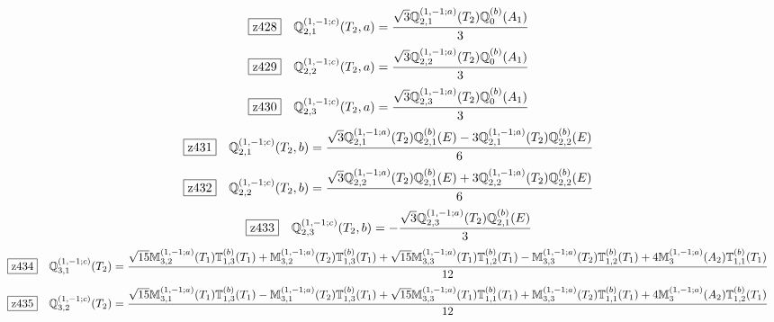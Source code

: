 \documentclass[fleqn,10pt,landscape]{jsarticle}
\begin{document}
\begin{dmath*}
\hspace*{3mm}\fbox{z428}\quad \mathbb{Q}_{2,1}^{(1,-1;c)}(T_{2},a)=\frac{\sqrt{3} \mathbb{Q}_{2,1}^{(1,-1;a)}(T_{2}) \mathbb{Q}_{0}^{(b)}(A_{1})}{3}
\end{dmath*}
\begin{dmath*}
\hspace*{3mm}\fbox{z429}\quad \mathbb{Q}_{2,2}^{(1,-1;c)}(T_{2},a)=\frac{\sqrt{3} \mathbb{Q}_{2,2}^{(1,-1;a)}(T_{2}) \mathbb{Q}_{0}^{(b)}(A_{1})}{3}
\end{dmath*}
\begin{dmath*}
\hspace*{3mm}\fbox{z430}\quad \mathbb{Q}_{2,3}^{(1,-1;c)}(T_{2},a)=\frac{\sqrt{3} \mathbb{Q}_{2,3}^{(1,-1;a)}(T_{2}) \mathbb{Q}_{0}^{(b)}(A_{1})}{3}
\end{dmath*}
\begin{dmath*}
\hspace*{3mm}\fbox{z431}\quad \mathbb{Q}_{2,1}^{(1,-1;c)}(T_{2},b)=\frac{\sqrt{3} \mathbb{Q}_{2,1}^{(1,-1;a)}(T_{2}) \mathbb{Q}_{2,1}^{(b)}(E) - 3 \mathbb{Q}_{2,1}^{(1,-1;a)}(T_{2}) \mathbb{Q}_{2,2}^{(b)}(E)}{6}
\end{dmath*}
\begin{dmath*}
\hspace*{3mm}\fbox{z432}\quad \mathbb{Q}_{2,2}^{(1,-1;c)}(T_{2},b)=\frac{\sqrt{3} \mathbb{Q}_{2,2}^{(1,-1;a)}(T_{2}) \mathbb{Q}_{2,1}^{(b)}(E) + 3 \mathbb{Q}_{2,2}^{(1,-1;a)}(T_{2}) \mathbb{Q}_{2,2}^{(b)}(E)}{6}
\end{dmath*}
\begin{dmath*}
\hspace*{3mm}\fbox{z433}\quad \mathbb{Q}_{2,3}^{(1,-1;c)}(T_{2},b)=- \frac{\sqrt{3} \mathbb{Q}_{2,3}^{(1,-1;a)}(T_{2}) \mathbb{Q}_{2,1}^{(b)}(E)}{3}
\end{dmath*}
\begin{dmath*}
\hspace*{3mm}\fbox{z434}\quad \mathbb{Q}_{3,1}^{(1,-1;c)}(T_{2})=\frac{\sqrt{15} \mathbb{M}_{3,2}^{(1,-1;a)}(T_{1}) \mathbb{T}_{1,3}^{(b)}(T_{1}) + \mathbb{M}_{3,2}^{(1,-1;a)}(T_{2}) \mathbb{T}_{1,3}^{(b)}(T_{1}) + \sqrt{15} \mathbb{M}_{3,3}^{(1,-1;a)}(T_{1}) \mathbb{T}_{1,2}^{(b)}(T_{1}) - \mathbb{M}_{3,3}^{(1,-1;a)}(T_{2}) \mathbb{T}_{1,2}^{(b)}(T_{1}) + 4 \mathbb{M}_{3}^{(1,-1;a)}(A_{2}) \mathbb{T}_{1,1}^{(b)}(T_{1})}{12}
\end{dmath*}
\begin{dmath*}
\hspace*{3mm}\fbox{z435}\quad \mathbb{Q}_{3,2}^{(1,-1;c)}(T_{2})=\frac{\sqrt{15} \mathbb{M}_{3,1}^{(1,-1;a)}(T_{1}) \mathbb{T}_{1,3}^{(b)}(T_{1}) - \mathbb{M}_{3,1}^{(1,-1;a)}(T_{2}) \mathbb{T}_{1,3}^{(b)}(T_{1}) + \sqrt{15} \mathbb{M}_{3,3}^{(1,-1;a)}(T_{1}) \mathbb{T}_{1,1}^{(b)}(T_{1}) + \mathbb{M}_{3,3}^{(1,-1;a)}(T_{2}) \mathbb{T}_{1,1}^{(b)}(T_{1}) + 4 \mathbb{M}_{3}^{(1,-1;a)}(A_{2}) \mathbb{T}_{1,2}^{(b)}(T_{1})}{12}
\end{dmath*}
\end{document}
